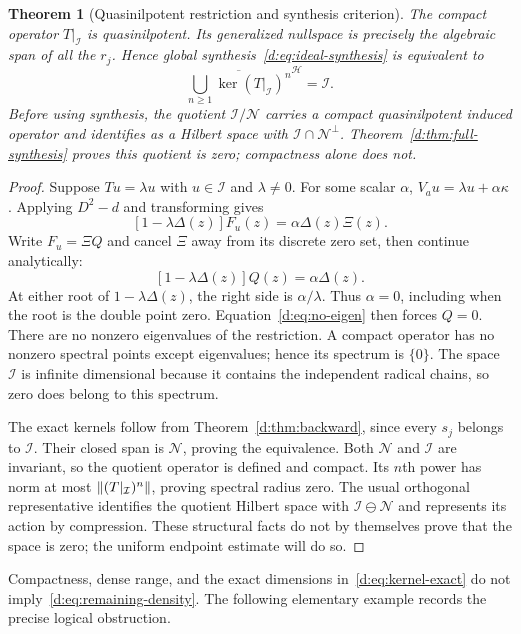 \documentclass[11pt,a4paper]{article}
\numberwithin{equation}{section}
\newtheorem{theorem}{Theorem}[section]
\theoremstyle{definition}\newtheorem{definition}[theorem]{Definition}
\theoremstyle{remark}\newtheorem{remark}[theorem]{Remark}
\newcommand{\Hh}{\mathcal H}\newcommand{\Hw}{\mathcal H}
\newcommand{\Nn}{\mathcal N}\newcommand{\Ii}{\mathcal I}\newcommand{\Zz}{\mathcal Z}
\begin{document}
\begin{theorem}[Quasinilpotent restriction and synthesis criterion]\label{d:thm:quasinilpotent}
The compact operator $T|_{\Ii}$ is quasinilpotent. Its generalized nullspace is precisely the algebraic span of all the $r_j$. Hence global synthesis~\eqref{d:eq:ideal-synthesis} is equivalent to
\begin{equation}\label{d:eq:remaining-density}
 \overline{\bigcup_{n\ge1}\ker(T|_{\Ii})^n}^{\Hh}=\Ii.
\end{equation}
Before using synthesis, the quotient $\Ii/\Nn$ carries a compact quasinilpotent induced operator and identifies as a Hilbert space with $\Ii\cap\Nn^\perp$. Theorem~\ref{d:thm:full-synthesis} proves this quotient is zero; compactness alone does not.
\end{theorem}
\begin{proof}
Suppose $Tu=\lambda u$ with $u\in\Ii$ and $\lambda\ne0$. For some scalar $\alpha$,
$V_au=\lambda u+\alpha\kappa$. Applying $D^2-d$ and transforming gives
\[
 [1-\lambda\Delta(z)]F_u(z)=\alpha\Delta(z)\Xi(z).
\]
Write $F_u=\Xi Q$ and cancel $\Xi$ away from its discrete zero set, then continue analytically:
\begin{equation}\label{d:eq:no-eigen}
 [1-\lambda\Delta(z)]Q(z)=\alpha\Delta(z).
\end{equation}
At either root of $1-\lambda\Delta(z)$, the right side is $\alpha/\lambda$. Thus $\alpha=0$, including when the root is the double point zero. Equation~\eqref{d:eq:no-eigen} then forces $Q=0$. There are no nonzero eigenvalues of the restriction. A compact operator has no nonzero spectral points except eigenvalues; hence its spectrum is $\{0\}$. The space $\Ii$ is infinite dimensional because it contains the independent radical chains, so zero does belong to this spectrum.

The exact kernels follow from Theorem~\ref{d:thm:backward}, since every $s_j$ belongs to $\Ii$. Their closed span is $\Nn$, proving the equivalence. Both $\Nn$ and $\Ii$ are invariant, so the quotient operator is defined and compact. Its $n$th power has norm at most $\norm{(T|_{\Ii})^n}$, proving spectral radius zero. The usual orthogonal representative identifies the quotient Hilbert space with $\Ii\ominus\Nn$ and represents its action by compression. These structural facts do not by themselves prove that the space is zero; the uniform endpoint estimate will do so.
\end{proof}

Compactness, dense range, and the exact dimensions in~\eqref{d:eq:kernel-exact} do not imply~\eqref{d:eq:remaining-density}. The following elementary example records the precise logical obstruction.
\end{document}
